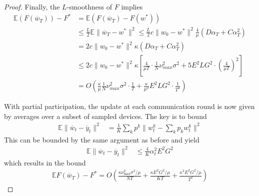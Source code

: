 \begin{proof}
		Finally, the $L$-smoothness of $F$ implies 
		\begin{align*}
		\mathbb{E}(F(\overline{w}_{T}))-F^{\ast} & =\mathbb{E}(F(\overline{w}_{T})-F(w^{\ast}))\\
		& \leq\frac{L}{2}\mathbb{E}\|\overline{w}_{T}-w^{\ast}\|^{2}\leq\frac{L}{2}c\|w_{0}-w^{\ast}\|^{2}\frac{4}{\mu}(D\alpha_{T}+C\alpha_{T}^{2})\\
		& =2c\|w_{0}-w^{\ast}\|^{2}\kappa(D\alpha_{T}+C\alpha_{T}^{2})\\
		& \leq2c\|w_{0}-w^{\ast}\|^{2}\kappa\left[\frac{4}{\mu T}\cdot\frac{1}{N}\nu_{max}^{2}\sigma^{2}+5E^{2}LG^{2}\cdot(\frac{4}{\mu T})^{2}\right]\\
		& =O(\frac{\kappa}{\mu}\frac{1}{N}\nu_{max}^{2}\sigma^{2}\cdot\frac{1}{T}+\frac{\kappa}{\mu^{2}}E^{2}LG^{2}\cdot\frac{1}{T^{2}})
		\end{align*}
		
		With partial participation, the update at each communication round
		is now given by averages over a subset of sampled devices. The key
		is to bound 
		\begin{align*}
		\mathbb{E}\|\overline{w}_{t}-\overline{y}_{t}\|^{2} & =\frac{1}{K}\sum_{k}p^{k}\|w_{t}^{k}-\sum_{k}p_{k}w_{t}^{k}\|^{2}
		\end{align*}
		This can be bounded by the same argument as before and yield 
		\begin{align*}
		\mathbb{E}\|\overline{w}_{t}-\overline{y}_{t}\|^{2} & \leq\frac{4}{K}\alpha_{t}^{2}E^{2}G^{2}
		\end{align*}
		which results in the bound 
		\begin{align*}
		\mathbb{E}F(\overline{w}_{T})-F^{\ast}=O(\frac{\kappa\nu_{\max}^{2}\sigma^{2}/\mu}{NT}+\frac{\kappa E^{2}G^{2}/\mu}{KT}+\frac{\kappa^{2}E^{2}G^{2}/\mu}{T^{2}})
		\end{align*}
	\end{proof}